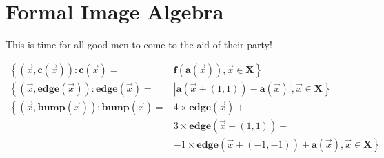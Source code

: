 \documentclass[12pt]{article}
\begin{document}
\section{Formal Image Algebra}
This is time for all good men to come to the aid of their party!

\begin{equation}\label{eq1}
\begin{aligned}
\left\{ \left( \vec{x}, \textbf{c}(\vec{x}) \right) : \textbf{c}(\vec{x}) = \right. & \left. \textbf{f}( \textbf{a}(\vec{x}) ), \vec{x} \in  \textbf{X} \right\} \\
\left\{ \left( \vec{x}, \textbf{edge}(\vec{x}) \right) : \textbf{edge}(\vec{x}) = \right. & \left. | \textbf{a}(\vec{x}+(1,1)) - \textbf{a}(\vec{x}) |, \vec{x} \in  \textbf{X} \right\} \\
\left\{ \left( \vec{x}, \textbf{bump}(\vec{x}) \right) : \textbf{bump}(\vec{x}) = \right. & \left. 4 \times \textbf{edge}(\vec{x}) + \right. \\
& \left. 3 \times \textbf{edge}(\vec{x}+(1,1)) + \right. \\
& \left. -1 \times \textbf{edge}(\vec{x}+(-1,-1)) + \textbf{a}(\vec{x}) , \vec{x} \in  \textbf{X} \right\}
\end{aligned}
\end{equation}
\end{document}
